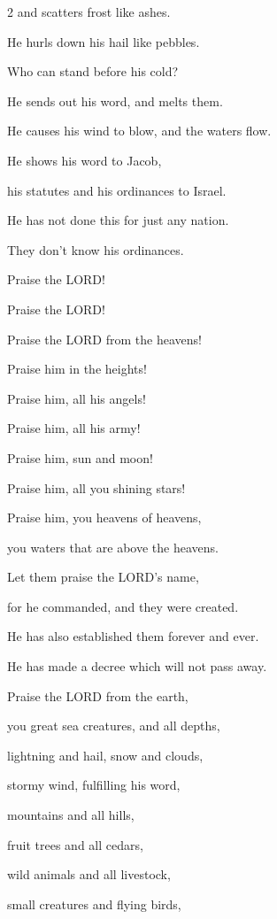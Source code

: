 \begin{multicols}{2}
	and scatters frost like ashes.
	
	
	\myverse{}He hurls down his hail like pebbles.
	
	Who can stand before his cold?
	
	
	\myverse{}He sends out his word, and melts them.
	
	He causes his wind to blow, and the waters flow.
	
	
	\myverse{}He shows his word to Jacob,
	
	his statutes and his ordinances to Israel.
	
	
	\myverse{}He has not done this for just any nation.
	
	They don’t know his ordinances.
	
	Praise the LORD!
	
	
	
	\mychapter{} \myverse*{}Praise the LORD!
	
	\quad\quad\quad Praise the LORD from the heavens!
	
	Praise him in the heights!
	
	
	\myverse{}Praise him, all his angels!
	
	Praise him, all his army!
	
	
	\myverse{}Praise him, sun and moon!
	
	Praise him, all you shining stars!
	
	
	\myverse{}Praise him, you heavens of heavens,
	
	you waters that are above the heavens.
	
	
	\myverse{}Let them praise the LORD’s name,
	
	for he commanded, and they were created.
	
	
	\myverse{}He has also established them forever and ever.
	
	He has made a decree which will not pass away.
	
	
	\myverse{}Praise the LORD from the earth,
	
	you great sea creatures, and all depths,
	
	
	\myverse{}lightning and hail, snow and clouds,
	
	stormy wind, fulfilling his word,
	
	
	\myverse{}mountains and all hills,
	
	fruit trees and all cedars,
	
	
	\myverse{}wild animals and all livestock,
	
	small creatures and flying birds,
	

\end{multicols}
